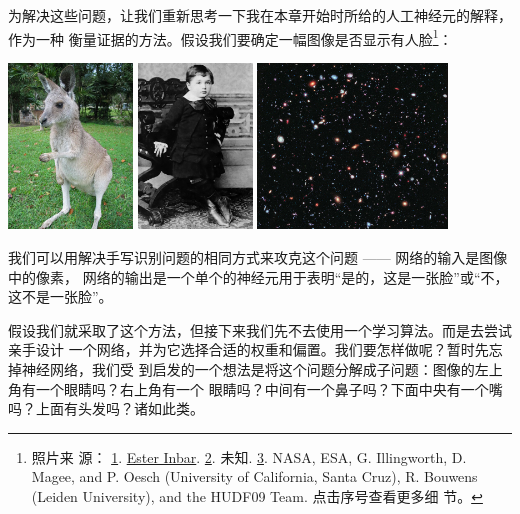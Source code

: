 为解决这些问题，让我们重新思考一下我在本章开始时所给的人工神经元的解释，作为一种
衡量证据的方法。假设我们要确定一幅图像是否显示有人脸\footnote{照片来
  源：
  \href{http://commons.wikimedia.org/wiki/File:Kangaroo_ST_03.JPG}{1}. \href{http://commons.wikimedia.org/wiki/User:ST}{Ester
    Inbar}. \href{http://commons.wikimedia.org/wiki/File:Albert_Einstein_at_the_age_of_three_(1882).jpg}{2}. 未知. \href{http://commons.wikimedia.org/wiki/File:The_Hubble_eXtreme_Deep_Field.jpg}{3}. NASA,
  ESA, G. Illingworth, D. Magee, and P. Oesch (University of California, Santa
  Cruz), R. Bouwens (Leiden University), and the HUDF09 Team. 点击序号查看更多细
  节。}：
\begin{center}
\includegraphics[height=125pt]{images/Kangaroo_ST_03}
\includegraphics[height=125pt]{images/Albert_Einstein_at_the_age_of_three_(1882)}
\includegraphics[height=125pt]{images/The_Hubble_eXtreme_Deep_Field}
\end{center}

我们可以用解决手写识别问题的相同方式来攻克这个问题 —— 网络的输入是图像中的像素，
网络的输出是一个单个的神经元用于表明“是的，这是一张脸”或“不，这不是一张脸”。

假设我们就采取了这个方法，但接下来我们先不去使用一个学习算法。而是去尝试亲手设计
一个网络，并为它选择合适的权重和偏置。我们要怎样做呢？暂时先忘掉神经网络，我们受
到启发的一个想法是将这个问题分解成子问题：图像的左上角有一个眼睛吗？右上角有一个
眼睛吗？中间有一个鼻子吗？下面中央有一个嘴吗？上面有头发吗？诸如此类。

